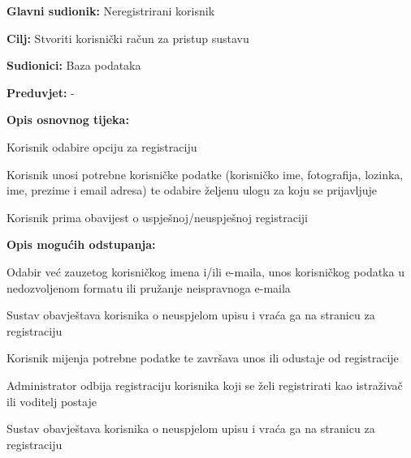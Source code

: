 					\noindent {}
					\begin{packed_item}
	
						\item \textbf{Glavni sudionik:} Neregistrirani korisnik
						\item \textbf{Cilj:} Stvoriti korisnički račun za pristup sustavu
						\item \textbf{Sudionici:} Baza podataka
						\item \textbf{Preduvjet:} -
						\item \textbf{Opis osnovnog tijeka:}
						
						\item[] \begin{packed_enum}
	
							\item Korisnik odabire opciju za registraciju  
							\item Korisnik unosi potrebne korisničke podatke (korisničko ime, fotografija, lozinka, ime, prezime i email adresa) te odabire željenu ulogu za koju se prijavljuje 
							\item Korisnik prima obavijest o uspješnoj/neuspješnoj registraciji
						\end{packed_enum}
						
						\item  \textbf{Opis mogućih odstupanja:}
						
						\item[] \begin{packed_item}
	
							\item[2.a] Odabir već zauzetog korisničkog imena i/ili e-maila, unos korisničkog podatka u nedozvoljenom formatu ili pružanje neispravnoga e-maila 
							\item[] \begin{packed_enum}
								
								\item Sustav obavještava korisnika o neuspjelom upisu i vraća ga na stranicu za registraciju 
								\item Korisnik mijenja potrebne podatke te završava unos ili odustaje od registracije 
								
							\end{packed_enum}
							\item[3.a] Administrator odbija registraciju korisnika koji se želi registrirati kao istraživač ili voditelj postaje
							\item[] \begin{packed_enum}
								
								\item Sustav obavještava korisnika o neuspjelom upisu i vraća ga na stranicu za registraciju 
								
							\end{packed_enum}
							
						\end{packed_item}
					\end{packed_item}
				
